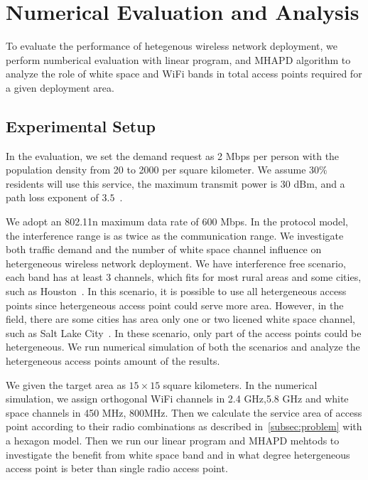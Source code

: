 \section{Numerical Evaluation and Analysis}
\label{sec:moaexperimentdesign}

To evaluate the performance of hetegenous wireless network deployment, we perform  
numberical evaluation with linear program, and MHAPD algorithm to analyze the role
of white space and WiFi bands in total access points required for a given deployment 
area.

\subsection{Experimental Setup}

In the evaluation, we set the demand request as 2 Mbps per person with the population
density from 20 to 2000 per square kilometer. We assume $30\%$ residents will use this
service, the maximum transmit power is 30 dBm, and a path loss exponent of $3.5$~\cite{meikle2012global}. 

We adopt an 802.11n maximum data rate of 600 Mbps. In the protocol model, the interference 
range is as twice as the communication range. We investigate both traffic demand and the 
number of white space channel influence on hetergeneous wireless network deployment. 
We have interference free scenario, each band has at least 3 channels, which fits for
most rural areas and some cities, such as Houston~\cite{googledatabase}. In this scenario,
it is possible to use all hetergeneous access points since hetergeneous access point could 
serve more area. However, in the field, there are some cities has area only one or two 
licened white space channel, such as Salt Lake City~\cite{googledatabase}. In these scenario, 
only part of the access points could be hetergeneous. We run numerical simulation of
both the scenarios and analyze the hetergeneous access points amount of the results.

We given the target area as $15\times 15$ square kilometers. In the numerical simulation, 
we assign orthogonal WiFi channels in 2.4 GHz,5.8 GHz and white space 
channels in 450 MHz, 800MHz. Then we calculate the service area of access point according to 
their radio combinations as described in~\ref{subsec:problem} with a hexagon model. Then we 
run our linear program and MHAPD mehtods to investigate the benefit from white space band 
and in what degree hetergeneous access point is beter than single radio access point. 


